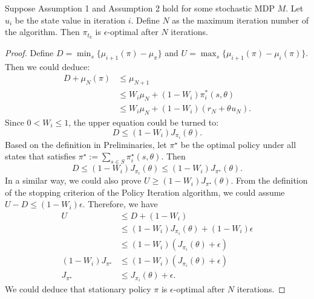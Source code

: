 \begin{lemma}
\label{appendix2}
Suppose Assumption 1 and Assumption 2 hold for some stochastic MDP $M$. Let $u_{i}$ be the state value in iteration $i$. Define $N$ as the maximum iteration number of the algorithm. Then $\pi_{t_{k}}$ is $\epsilon$-optimal after $N$ iterations.
\begin{proof}
Define $D = \min_{s}\{\mu_{i+1}(\pi)-\mu_{\pi}\}$ and $U = \max_{s}\{\mu_{i+1}(\pi)-\mu_{i}(\pi)\}$. Then we could deduce:
\begin{equation}
\begin{aligned}
D + \mu_{N}(\pi) &\leq \mu_{N+1}\\
&\leq W_{i}\mu_{N} + (1-W_{i})\pi_{i}^{*}(s,\theta)\\
&\leq W_{i}\mu_{N} + (1-W_{i})(r_{N} + \theta_{} u_{N}).
\end{aligned}
\end{equation}
Since $0 < W_{i} \leq 1$, the upper equation could be turned to:
\begin{equation}
D \leq (1-W_{i})J_{\pi_{i}}(\theta).
\end{equation}
Based on the definition in Preliminaries, let $\pi^{\star}$ be the optimal policy under all states that satisfies $\pi^{\star} := \sum_{s \in S}\pi_{i}^{\star}(s,\theta)$. Then
\begin{equation}
D \leq (1-W_{i})J_{\pi_{i}}(\theta) \leq (1-W_{i})J_{\pi^{\star}}(\theta).
\end{equation}
In a similar way, we could also prove $U \geq (1-W_{i})J_{\pi^{\star}}(\theta)$. From the definition of the stopping criterion of the Policy Iteration algorithm, we could assume $U - D \leq (1-W_{i})\epsilon$. Therefore, we have
\begin{equation}
\begin{aligned}
U &\leq D + (1-W_{i}) \\
&\leq (1-W_{i})J_{\pi_{i}}(\theta)+(1-W_{i})\epsilon\\
&\leq (1-W_{i})(J_{\pi_{i}}(\theta)+\epsilon)\\
(1-W_{i})J_{\pi^{\star}} &\leq (1-W_{i})(J_{\pi_{i}}(\theta)+\epsilon)\\
J_{\pi^{\star}} &\leq J_{\pi_{i}}(\theta)+\epsilon.
\end{aligned}
\end{equation}
We could deduce that stationary policy $\pi$ is $\epsilon$-optimal after $N$ iterations.
\end{proof}
\end{lemma}


